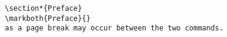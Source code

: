 \begin{verbatim}
\section*{Preface}
\markboth{Preface}{}
as a page break may occur between the two commands.

\end{verbatim}















